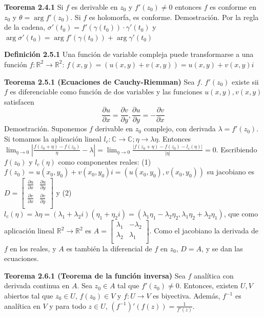 \documentclass[a4paper, 11pt]{extarticle}
\newcommand{\tma}[1]{\textcolor{rojo}{\textbf{Teorema #1}}}
\newcommand{\defi}[1]{\textcolor{azul}{\textbf{Definición #1}}}
\newcommand{\dem}[1]{\textcolor{gris}{\small{Demostración. #1}}}
\begin{document}
\begin{multicols*}{2}
\tma{2.4.1} Si \(f\) es derivable en \(z_0\) y \(f'(z_0) \neq 0\) entonces
\(f\) es conforme en \(z_0\) y \(\theta = \arg f'(z_0)\). Si \(f\) es
holomorfa, es conforme.
\dem{ Por la regla de la cadena, \( \sigma'(t_0) = f'(\gamma(t_0))\cdot \gamma'(t_0) \)  y \( \arg  \sigma'(t_0)
 = \arg f'(\gamma(t_0))+\arg  \gamma'(t_0) \) }

\defi{2.5.1} Una función de variable compleja puede transformarse a una función
\(f: \mathbb{R}^2 \rightarrow  \mathbb{R}^2\): \(f(x,y) = (u(x,y) + v(x,y)) =
u(x,y) + v(x,y)i\)

\tma{2.5.1 (Ecuaciones de Cauchy-Riemman) } Sea \(f\). \(f'(z_0)\) existe sii \(f\) es diferenciable como
función de dos variables y las funciones \(u(x,y), v(x,y)\) satisfacen
\vspace{-1em} \[
\frac{\partial u}{\partial x} = \frac{\partial v}{\partial y}, 
\frac{\partial u}{\partial y} = - \frac{\partial v}{\partial x} \]
\dem{ Suponemos \( f \) derivable en \( z_0 \) complejo, con derivada \( \lambda = f'(z_0) \). 
Si tomamos la aplicación lineal \( l_c : \mathbb{C} \rightarrow  \mathbb{C}; \eta \rightarrow \lambda\eta \).
Entonces \( \lim_{\eta \to 0} \left|\frac{f(z_0 + \eta) - f(z_0)}{\eta} - \lambda  \right| = \lim_{\eta \to 0} 
\frac{|f(z_0 + \eta) - f(z_0) - l_c(\eta)|}{|\eta|} =  0 \). Escribiendo \( f(z_0) \) y 
\( l_c(\eta) \) como componentes reales: (1) \( f(z_0) = u(x_0, y_0) + v(x_0,y_0)i = 
(u(x_0, y_0), v(x_0, y_0)) \) su jacobiano es \( D= \begin{bmatrix}
\frac{\partial u}{\partial x} &  \frac{\partial u}{\partial y} \\ 
\frac{\partial v}{\partial x} &  \frac{\partial v}{\partial y} \\ 
\end{bmatrix}  \) y (2)
\(l_c(\eta) = \lambda\eta = (\lambda_1 + \lambda_2i)(\eta_1 + \eta_2i) = (\lambda_1\eta_1 - \lambda_2\eta_2, \lambda_1\eta_2 + \lambda_2\eta_1)  \), 
que como aplicación lineal \( \mathbb{R}^2 \rightarrow  \mathbb{R}^2 \) 
es \( A= \begin{bmatrix}
\lambda_1 &  -\lambda_2 \\ 
\lambda_2 &  \lambda_1 \\ 
\end{bmatrix}  \). Como el jacobiano la derivada de \( f \) en los reales, y \( A \) es también la diferencial de 
\( f \) en \( z_0 \), \( D = A \), y se dan las ecuaciones. }

\tma{2.6.1 (Teorema de la función inversa)} Sea \(f\) analítica con derivada
continua en \(A\). Sea \(z_0 \in A\) tal que \(f'(z_0) \neq 0\). Entonces,
existen \(U, V\) abiertos tal que \(z_0 \in U\), \(f(z_0) \in V\) y \(f:
U \rightarrow  V\) es biyectiva. Además, \(f^{-1}\) es analítica en \(V\) y para
todo \(z \in U\), \((f^{-1})'(f(z)) = \frac{1}{f'(z)}\).



\end{multicols*}
\pagebreak
\end{document}
